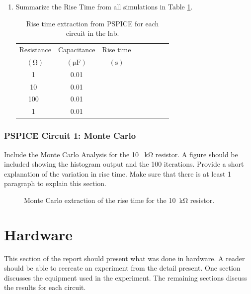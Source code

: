 \documentclass[11pt]{article}
\begin{document}
\begin{enumerate}
\begin{figure}[h!]
	\label{fig:PSPICETrans100k}
\end{figure}
\begin{figure}[h!]
	\vspace{2in}
	\caption{Transient simulation in PSPICE of circuits 1 and 2 for a 1~\si{\mega\ohm} resistor and 0.01~\si{\micro\farad} capacitor.  The rise time was XXX~\si{\s}.  }
	\label{fig:PSPICETrans1M}
\end{figure}
		\item Summarize the Rise Time from all simulations in Table \ref{Table:RiseTimeTablePSPICE}.
		\begin{table}[h]
			\centering
			\caption{Rise time extraction from PSPICE for each circuit in the lab.}
			\label{Table:RiseTimeTablePSPICE}
			\begin{tabular}{|c |c|| c|| c | c | c| c|c |}\hline
				Resistance  & Capacitance &  Rise time    \\
				$\left(\si{\ohm}\right)$ 	  & $\left(\si{\micro\farad}\right)$	 & $\left(\si{\s}\right)$   \\
				
				\hline
				1~\si{\kilo}& 0.01&  \\
				\hline
				10~\si{\kilo}& 0.01&  \\
				\hline
				100~\si{\kilo}& 0.01&  \\
				\hline
				1~\si{\mega}& 0.01&  \\
				\hline
			\end{tabular}
		\end{table}
\end{enumerate}
\clearpage
\subsubsection{PSPICE Circuit 1: Monte Carlo}
Include the Monte Carlo Analysis for the 10 ~\si{\kilo\ohm} resistor.  A figure should be included showing the histogram output and the 100 iterations.  Provide a short explanation of the variation in rise time. 
Make sure that there is at least 1 paragraph to explain this section.
\begin{figure}[h!]
	\vspace{2in}
	\caption{Monte Carlo extraction of the rise time for the 10~\si{\kilo\ohm} resistor.}
	\label{fig:MonteCarlo10k}
\end{figure}
\section {Hardware}
This section of the report should present what was done in hardware.  A reader should be able to recreate an experiment from the detail present.  One section discusses the equipment used in the experiment. The remaining sections discuss the results for each circuit.
\end{document}
